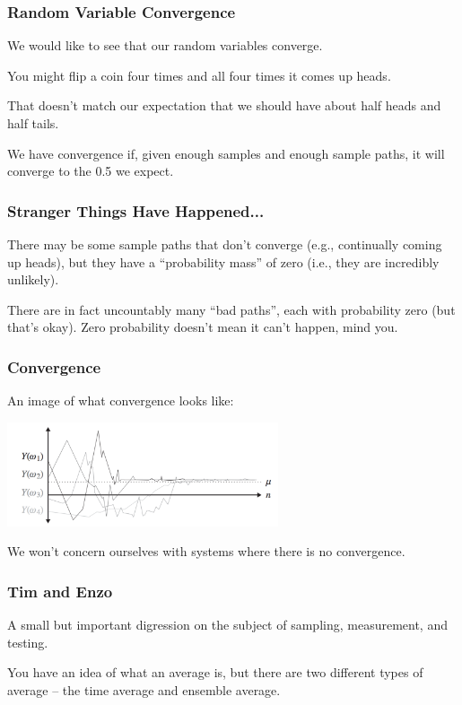 \begin{frame}
\frametitle{Random Variable Convergence}

We would like to see that our random variables converge. 

You might flip a coin four times and all four times it comes up heads. 

That doesn't match our expectation that we should have about half heads and half tails.

We have convergence if, given enough samples and enough sample paths, it will converge to the 0.5 we expect. 

\end{frame}


\begin{frame}
\frametitle{Stranger Things Have Happened...}

There may be some sample paths that don't converge (e.g., continually coming up heads), but they have a ``probability mass'' of zero (i.e., they are incredibly unlikely).  

There are in fact uncountably many ``bad paths'', each with probability zero (but that's okay). Zero probability doesn't mean it can't happen, mind you.

\end{frame}



\begin{frame}
\frametitle{Convergence}

An image of what convergence looks like:

\begin{center}
	\includegraphics[width=0.6\textwidth]{images/convergence.png}
\end{center}

We won't concern ourselves with systems where there is no convergence. 

\end{frame}



\begin{frame}
\frametitle{Tim and Enzo}

A small but important digression on the subject of sampling, measurement, and testing.

You have an idea of what an average is, but there are two different types of average -- the time average and ensemble average. 


\end{frame}



